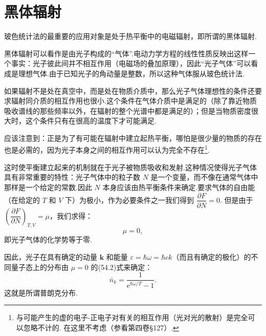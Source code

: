 \section{黑体辐射}

玻色统计法的最重要的应用对象是处于热平衡中的电磁辐射，即所谓的黑体辐射.

黑体辐射可以看作是由光子构成的“气体”.电动力学方程的线性性质反映出这样一个事实：光子彼此间并不相互作用（电磁场的叠加原理），因此“光子气体”可以看成是理想气体.由于已知光子的角动量是整数，所以这种气体服从玻色统计法.

如果辐射不是处在真空中，而是处在物质介质中，那么光子气体理想性的条件还要求辐射同介质的相互作用也很小.这个条件在气体介质中是满足的（除了靠近物质吸收谱线的那些频率以外，在辐射的整个光谱中都是满足的）；但是当物质密度很大时，这个条件只有在很高的温度下才可能满足.

应该注意到：正是为了有可能在辐射中建立起热平衡，哪怕是很少量的物质的存在也是必需的，因为光子本身之间的相互作用可以认为完全不存在\footnote{与可能产生的虚的电子-正电子对有关的相互作用（光对光的散射）是完全可以忽略不计的. 在这里不考虑（参看第四卷§127）.}.

这时使平衡建立起来的机制就在于光子被物质吸收和发射.这种情况使得光子气体具有非常重要的特性：光子气体中的粒子数 $N$ 是一个变量，而不像在通常气体中那样是一个给定的常数.因此 $N$ 本身应该由热平衡条件来确定.要求气体的自由能（在给定的 $T$ 和 $V$ 下）为极小，作为必要条件之一我们得到 $\dfrac{\partial F}{\partial N}=0$. 但是由于 $\left(\dfrac{\partial F}{\partial N}\right)_{T,V}=\mu$，我们求得：
\begin{equation}
  \mu=0,
\end{equation}
即光子气体的化学势等于零.

因此，光子在具有确定的动量 $\boldsymbol{k}$ 和能量 $\varepsilon=\hbar\omega=\hbar ck$（而且有确定的极化）的不同量子态上的分布由 $\mu=0$ 的(54.2)式来确定：
\begin{equation}
  \bar{n}_k=\frac{1}{\mathrm{e}^{\hbar\omega/T}-1}.
\end{equation}
这就是所谓普朗克分布.

